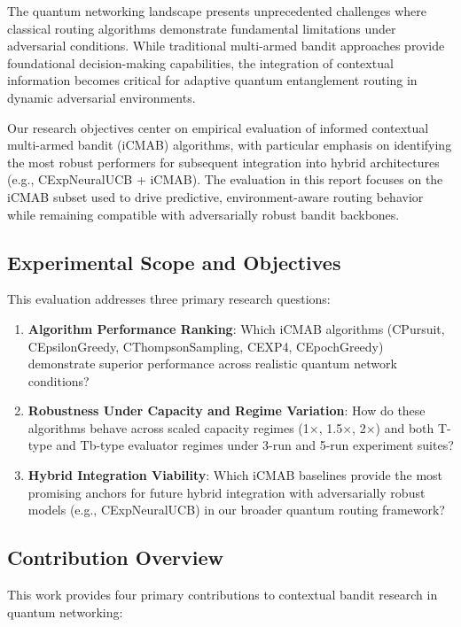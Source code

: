 \documentclass[12pt,a4paper]{article}
\begin{document}
The quantum networking landscape presents unprecedented challenges where classical routing algorithms demonstrate fundamental limitations under adversarial conditions. While traditional multi-armed bandit approaches provide foundational decision-making capabilities, the integration of contextual information becomes critical for adaptive quantum entanglement routing in dynamic adversarial environments.

Our research objectives center on empirical evaluation of informed contextual multi-armed bandit (iCMAB) algorithms, with particular emphasis on identifying the most robust performers for subsequent integration into hybrid architectures (e.g., CExpNeuralUCB + iCMAB). The evaluation in this report focuses on the iCMAB subset used to drive predictive, environment-aware routing behavior while remaining compatible with adversarially robust bandit backbones.

\subsection{Experimental Scope and Objectives}

This evaluation addresses three primary research questions:

\begin{enumerate}
\item \textbf{Algorithm Performance Ranking}: Which iCMAB algorithms (CPursuit, CEpsilonGreedy, CThompsonSampling, CEXP4, CEpochGreedy) demonstrate superior performance across realistic quantum network conditions?
\item \textbf{Robustness Under Capacity and Regime Variation}: How do these algorithms behave across scaled capacity regimes (1$\times$, 1.5$\times$, 2$\times$) and both T-type and Tb-type evaluator regimes under 3-run and 5-run experiment suites?
\item \textbf{Hybrid Integration Viability}: Which iCMAB baselines provide the most promising anchors for future hybrid integration with adversarially robust models (e.g., CExpNeuralUCB) in our broader quantum routing framework?
\end{enumerate}

\subsection{Contribution Overview}

This work provides four primary contributions to contextual bandit research in quantum networking:
\end{document}
